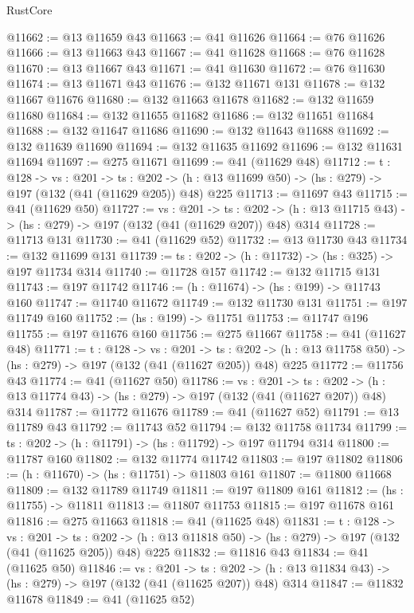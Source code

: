 \begin{lexlean}{RustCore}
\begin{coremodule}
@11662 := @13 @11659 @43
@11663 := @41 @11626
@11664 := @76 @11626
@11666 := @13 @11663 @43
@11667 := @41 @11628
@11668 := @76 @11628
@11670 := @13 @11667 @43
@11671 := @41 @11630
@11672 := @76 @11630
@11674 := @13 @11671 @43
@11676 := @132 @11671 @131
@11678 := @132 @11667 @11676
@11680 := @132 @11663 @11678
@11682 := @132 @11659 @11680
@11684 := @132 @11655 @11682
@11686 := @132 @11651 @11684
@11688 := @132 @11647 @11686
@11690 := @132 @11643 @11688
@11692 := @132 @11639 @11690
@11694 := @132 @11635 @11692
@11696 := @132 @11631 @11694
@11697 := @275 @11671
@11699 := @41 (@11629 @48)
@11712 := {t : @128} ->
  {vs : @201} ->
  {ts : @202} -> (h : @13 @11699 @50) -> (hs : @279) -> @197 (@132 (@41 (@11629 @205)) @48) @225
@11713 := @11697 @43
@11715 := @41 (@11629 @50)
@11727 := {vs : @201} ->
  {ts : @202} -> (h : @13 @11715 @43) -> (hs : @279) -> @197 (@132 (@41 (@11629 @207)) @48) @314
@11728 := @11713 @131
@11730 := @41 (@11629 @52)
@11732 := @13 @11730 @43
@11734 := @132 @11699 @131
@11739 := {ts : @202} -> (h : @11732) -> (hs : @325) -> @197 @11734 @314
@11740 := @11728 @157
@11742 := @132 @11715 @131
@11743 := @197 @11742
@11746 := (h : @11674) -> (hs : @199) -> @11743 @160
@11747 := @11740 @11672
@11749 := @132 @11730 @131
@11751 := @197 @11749 @160
@11752 := (hs : @199) -> @11751
@11753 := @11747 @196
@11755 := @197 @11676 @160
@11756 := @275 @11667
@11758 := @41 (@11627 @48)
@11771 := {t : @128} ->
  {vs : @201} ->
  {ts : @202} -> (h : @13 @11758 @50) -> (hs : @279) -> @197 (@132 (@41 (@11627 @205)) @48) @225
@11772 := @11756 @43
@11774 := @41 (@11627 @50)
@11786 := {vs : @201} ->
  {ts : @202} -> (h : @13 @11774 @43) -> (hs : @279) -> @197 (@132 (@41 (@11627 @207)) @48) @314
@11787 := @11772 @11676
@11789 := @41 (@11627 @52)
@11791 := @13 @11789 @43
@11792 := @11743 @52
@11794 := @132 @11758 @11734
@11799 := {ts : @202} -> (h : @11791) -> (hs : @11792) -> @197 @11794 @314
@11800 := @11787 @160
@11802 := @132 @11774 @11742
@11803 := @197 @11802
@11806 := (h : @11670) -> (hs : @11751) -> @11803 @161
@11807 := @11800 @11668
@11809 := @132 @11789 @11749
@11811 := @197 @11809 @161
@11812 := (hs : @11755) -> @11811
@11813 := @11807 @11753
@11815 := @197 @11678 @161
@11816 := @275 @11663
@11818 := @41 (@11625 @48)
@11831 := {t : @128} ->
  {vs : @201} ->
  {ts : @202} -> (h : @13 @11818 @50) -> (hs : @279) -> @197 (@132 (@41 (@11625 @205)) @48) @225
@11832 := @11816 @43
@11834 := @41 (@11625 @50)
@11846 := {vs : @201} ->
  {ts : @202} -> (h : @13 @11834 @43) -> (hs : @279) -> @197 (@132 (@41 (@11625 @207)) @48) @314
@11847 := @11832 @11678
@11849 := @41 (@11625 @52)

\end{coremodule}
\end{lexlean}
